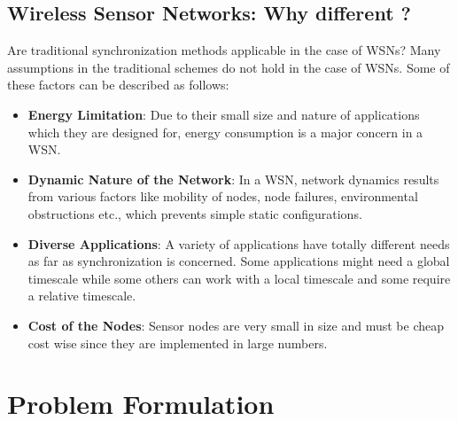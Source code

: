 \documentclass[journal]{IEEEtran}
\begin{document}
\subsection{\textbf{Wireless Sensor Networks: Why different ?}}
     Are traditional synchronization methods applicable in the case of WSNs? Many
assumptions in the traditional schemes do not hold in the case
of WSNs. Some of these factors can be described as follows:
\begin{itemize}
\item \textbf{Energy Limitation}: Due to their small size and nature of applications which they
are designed for, energy consumption is a major concern in a WSN.
\item \textbf{Dynamic Nature of the Network}: In a WSN, network
dynamics results from various factors like mobility of nodes, node
failures, environmental obstructions etc., which prevents simple
static configurations.
\item \textbf{Diverse Applications}: A variety of applications 
have totally different needs as far as synchronization is concerned.
Some applications might need a global timescale while
some others can work with a local timescale and some require a relative timescale.
\item \textbf{Cost of the Nodes}: Sensor nodes are very small in size
and must be cheap cost wise since they are implemented in large
numbers.
\end{itemize}
\section{\textbf{Problem Formulation}}
\end{document}
